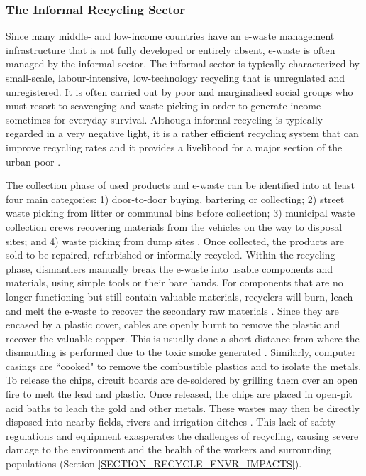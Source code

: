 \documentclass{article}
\begin{document}
\subsubsection{The Informal Recycling Sector}
Since many middle- and low-income countries have an e-waste management infrastructure that is not fully developed or entirely absent, e-waste is often managed by the informal sector. The informal sector is typically characterized by small-scale, labour-intensive, low-technology recycling that is unregulated and unregistered. It is often carried out by poor and marginalised social groups who must resort to scavenging and waste picking in order to generate income---sometimes for everyday survival. Although informal recycling is typically regarded in a very negative light, %
it is a rather efficient recycling system that can improve recycling rates and it provides a livelihood for a major section of the urban poor \cite{wilson2006role, medina2000scavenger}.

The collection phase of used products and e-waste can be identified into at least four main categories: 1) door-to-door buying, bartering or collecting; 2) street waste picking from litter or communal bins before collection; 3) municipal waste collection crews recovering materials from the vehicles on the way to disposal sites; and 4) waste picking from dump sites \cite{wilson2006role}. Once collected, the products are sold to be repaired, refurbished or informally recycled. Within the recycling phase, dismantlers manually break the e-waste into usable components and materials, using simple tools or their bare hands. For components that are no longer functioning but still contain valuable materials, recyclers will burn, leach and melt the e-waste to recover the secondary raw materials \cite{forti2020global}. Since they are encased by a plastic cover, cables are openly burnt to remove the plastic and recover the valuable copper. This is usually done a short distance from where the dismantling is performed due to the toxic smoke generated \cite{akormedi2013working}. Similarly, computer casings are ``cooked" to remove the combustible plastics and to isolate the metals. To release the chips, circuit boards are de-soldered by grilling them over an open fire to melt the lead and plastic. Once released, the chips are placed in open-pit acid baths to leach the gold and other metals. These wastes may then be directly disposed into nearby fields, rivers and irrigation ditches \cite{chan2013review, sthiannopkao2013handling}. This lack of safety regulations and equipment exasperates the challenges of recycling, causing severe damage to the environment and the health of the workers and surrounding populations (Section \ref{SECTION_RECYCLE_ENVR_IMPACTS}).
\end{document}
